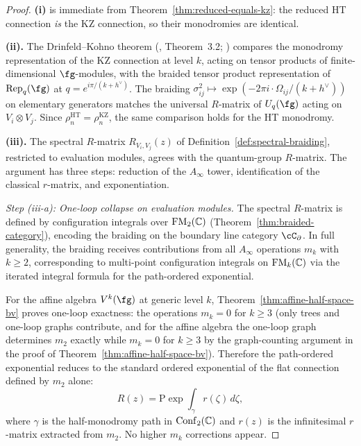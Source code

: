 \begin{proof}
\textbf{(i)} is immediate from Theorem~\ref{thm:reduced-equals-kz}: the reduced HT connection \emph{is} the KZ connection, so their monodromies are identical.

\medskip
\noindent\textbf{(ii).} The Drinfeld--Kohno theorem (\cite{Dri89}, Theorem~3.2; \cite{KL93}) compares the monodromy representation of the KZ connection at level $k$, acting on tensor products of finite-dimensional $\fg$-modules, with the braided tensor product representation of $\mathrm{Rep}_q(\fg)$ at $q = e^{i\pi/(k + h^\vee)}$. The braiding $\sigma_{ij}^2 \mapsto \exp(-2\pi i \cdot \Omega_{ij}/(k + h^\vee))$ on elementary generators matches the universal $R$-matrix of $U_q(\fg)$ acting on $V_i \otimes V_j$. Since $\rho_n^{\mathrm{HT}} = \rho_n^{\mathrm{KZ}}$, the same comparison holds for the HT monodromy.

\medskip
\noindent\textbf{(iii).} The spectral $R$-matrix
$R_{V_i,V_j}(z)$ of Definition~\ref{def:spectral-braiding},
restricted to evaluation modules, agrees with the quantum-group
$R$-matrix. The argument has three steps: reduction of the
$A_\infty$ tower, identification of the classical $r$-matrix, and
exponentiation.

\smallskip\noindent
\emph{Step (iii-a): One-loop collapse on evaluation modules.}
The spectral $R$-matrix is defined by configuration integrals
over $\mathrm{FM}_2(\mathbb C)$ (Theorem~\ref{thm:braided-category}),
encoding the braiding on the boundary line category
$\cC_\partial$. In full generality, the braiding receives
contributions from all $A_\infty$ operations $m_k$ with
$k \geq 2$, corresponding to multi-point configuration
integrals on $\mathrm{FM}_k(\mathbb C)$ via the iterated integral formula
for the path-ordered exponential.

For the affine algebra $V^k(\fg)$ at generic level $k$,
Theorem~\ref{thm:affine-half-space-bv} proves one-loop
exactness: the operations $m_k = 0$ for $k \geq 3$
(only trees and one-loop graphs contribute, and for the
affine algebra the one-loop graph determines $m_2$ exactly
while $m_k = 0$ for $k \geq 3$ by the graph-counting argument
in the proof of Theorem~\ref{thm:affine-half-space-bv}). Therefore the
path-ordered exponential reduces to the standard ordered
exponential of the flat connection defined by $m_2$ alone:
\[
 R(z) = \mathrm{P}\!\exp\!\int_\gamma r(\zeta)\, d\zeta,
\]
where $\gamma$ is the half-monodromy path in $\mathrm{Conf}_2(\mathbb C)$
and $r(z)$ is the infinitesimal $r$-matrix extracted from $m_2$.
No higher $m_k$ corrections appear.


\end{proof}
